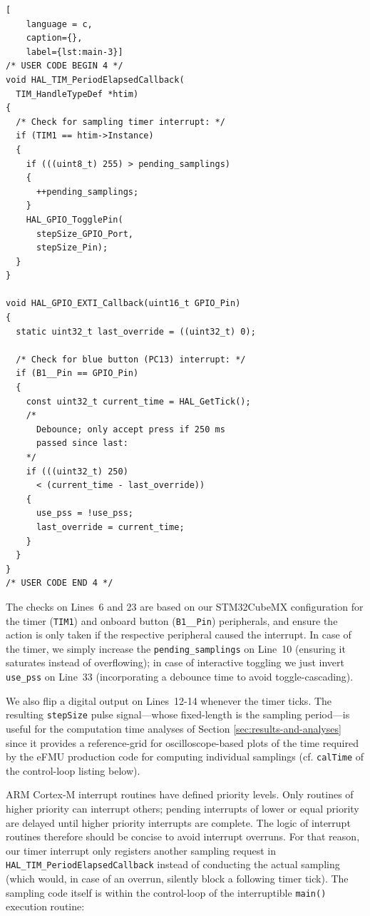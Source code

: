 \begin{lstlisting}[
    language = c,
    caption={},
    label={lst:main-3}]
/* USER CODE BEGIN 4 */
void HAL_TIM_PeriodElapsedCallback(
  TIM_HandleTypeDef *htim)
{
  /* Check for sampling timer interrupt: */
  if (TIM1 == htim->Instance)
  {
    if (((uint8_t) 255) > pending_samplings)
    {
      ++pending_samplings;
    }
    HAL_GPIO_TogglePin(
      stepSize_GPIO_Port,
      stepSize_Pin);
  }
}

void HAL_GPIO_EXTI_Callback(uint16_t GPIO_Pin)
{
  static uint32_t last_override = ((uint32_t) 0);

  /* Check for blue button (PC13) interrupt: */
  if (B1__Pin == GPIO_Pin)
  {
    const uint32_t current_time = HAL_GetTick();
    /*
      Debounce; only accept press if 250 ms
      passed since last:
    */
    if (((uint32_t) 250)
      < (current_time - last_override))
    {
      use_pss = !use_pss;
      last_override = current_time;
    }
  }
}
/* USER CODE END 4 */
\end{lstlisting}

\noindent{}The checks on Lines~6 and 23 are based on our STM32CubeMX \controller{} configuration for the timer (\texttt{TIM1}) and onboard button (\texttt{B1\_\_Pin}) peripherals, and ensure the action is only taken if the respective peripheral caused the interrupt. In case of the timer, we simply increase the \texttt{pending\_samplings} on Line~10 (ensuring it saturates instead of overflowing); in case of interactive \controller{} toggling we just invert \texttt{use\_pss} on Line~33 (incorporating a debounce time to avoid toggle-cascading).

We also flip a digital output on Lines~12-14 whenever the timer ticks. The resulting \texttt{stepSize} pulse signal---whose fixed-length is the sampling period---is useful for the computation time analyses of Section \ref{sec:results-and-analyses} since it provides a reference-grid for oscilloscope-based plots of the time required by the eFMU production code for computing individual samplings (cf. \texttt{calTime} of the control-loop listing below).

ARM Cortex-M interrupt routines have defined priority levels. Only routines of higher priority can interrupt others; pending interrupts of lower or equal priority are delayed until higher priority interrupts are complete. The logic of interrupt routines therefore should be concise to avoid interrupt overruns. For that reason, our timer interrupt only registers another sampling request in \texttt{HAL\_TIM\_PeriodElapsedCallback} instead of conducting the actual sampling (which would, in case of an overrun, silently block a following timer tick). The sampling code itself is within the control-loop of the interruptible \texttt{main()} execution routine:

